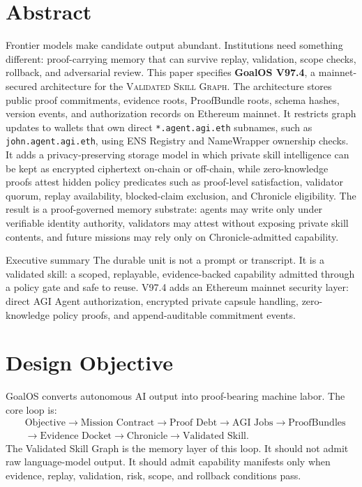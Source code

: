 \documentclass[11pt]{article}
\newcommand{\term}[1]{\textsc{#1}}
\newcommand{\code}[1]{\texttt{#1}}
\begin{document}
\section*{Abstract}
Frontier models make candidate output abundant. Institutions need something different: proof-carrying memory that can survive replay, validation, scope checks, rollback, and adversarial review. This paper specifies \textbf{GoalOS V97.4}, a mainnet-secured architecture for the \term{Validated Skill Graph}. The architecture stores public proof commitments, evidence roots, ProofBundle roots, schema hashes, version events, and authorization records on Ethereum mainnet. It restricts graph updates to wallets that own direct \code{*.agent.agi.eth} subnames, such as \code{john.agent.agi.eth}, using ENS Registry and NameWrapper ownership checks. It adds a privacy-preserving storage model in which private skill intelligence can be kept as encrypted ciphertext on-chain or off-chain, while zero-knowledge proofs attest hidden policy predicates such as proof-level satisfaction, validator quorum, replay availability, blocked-claim exclusion, and Chronicle eligibility. The result is a proof-governed memory substrate: agents may write only under verifiable identity authority, validators may attest without exposing private skill contents, and future missions may rely only on Chronicle-admitted capability.

\begin{thesisbox}{Executive summary}
The durable unit is not a prompt or transcript. It is a validated skill: a scoped, replayable, evidence-backed capability admitted through a policy gate and safe to reuse. V97.4 adds an Ethereum mainnet security layer: direct AGI Agent authorization, encrypted private capsule handling, zero-knowledge policy proofs, and append-auditable commitment events.
\end{thesisbox}

\section{Design Objective}
GoalOS converts autonomous AI output into proof-bearing machine labor. The core loop is:
\[
\begin{aligned}
&\text{Objective}\rightarrow\text{Mission Contract}\rightarrow\text{Proof Debt}\rightarrow\text{AGI Jobs}\rightarrow\text{ProofBundles}\\[-1mm]
&\rightarrow\text{Evidence Docket}\rightarrow\text{Chronicle}\rightarrow\text{Validated Skill}.
\end{aligned}
\]
The Validated Skill Graph is the memory layer of this loop. It should not admit raw language-model output. It should admit capability manifests only when evidence, replay, validation, risk, scope, and rollback conditions pass.
\end{document}
